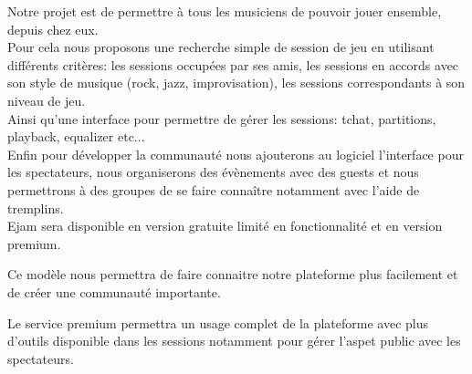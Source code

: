 \documentclass[a4,12pt]{article}
\begin{document}
Notre projet est de permettre à tous les musiciens de pouvoir jouer ensemble,
depuis chez eux.
\\

Pour cela nous proposons une recherche simple de session de jeu en utilisant différents critères:
les sessions occupées par ses amis,
les sessions en accords avec son style de musique (rock, jazz, improvisation),
les sessions correspondants à son niveau de jeu.\\

Ainsi qu'une interface pour permettre de gérer les sessions: tchat, partitions, playback, equalizer etc... \\


Enfin pour développer la communauté nous ajouterons au logiciel
l’interface pour les spectateurs, nous organiserons des évènements avec des
guests et nous permettrons à des groupes de se faire connaître notamment
avec l’aide de tremplins.
\\

Ejam sera disponible en version gratuite limité en fonctionnalité et en version premium.

Ce modèle nous permettra de faire connaitre notre plateforme plus facilement et de créer une communauté importante.

Le service premium permettra un usage complet de la plateforme avec plus d'outils disponible dans les sessions notamment pour gérer l'aspet public avec les spectateurs.
\end{document}
